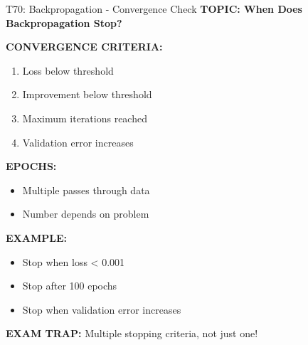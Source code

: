 \documentclass[8pt]{beamer}
\begin{document}
	\begin{frame}{T70: Backpropagation - Convergence Check}
		\fontsize{6.5}{7.5}\selectfont
		\textbf{TOPIC: When Does Backpropagation Stop?}
		
		\vspace{0.1cm}
		\textbf{CONVERGENCE CRITERIA:}
		\begin{enumerate}
			\item Loss below threshold
			\item Improvement below threshold
			\item Maximum iterations reached
			\item Validation error increases
		\end{enumerate}
		
		\vspace{0.1cm}
		\textbf{EPOCHS:}
		\begin{itemize}
			\item Multiple passes through data
			\item Number depends on problem
		\end{itemize}
		
		\vspace{0.1cm}
		\textbf{EXAMPLE:}
		\begin{itemize}
			\item Stop when loss < 0.001
			\item Stop after 100 epochs
			\item Stop when validation error increases
		\end{itemize}
		
		\textcolor{myred}{\textbf{EXAM TRAP:}} Multiple stopping criteria, not just one!
	\end{frame}
	
\end{document}
